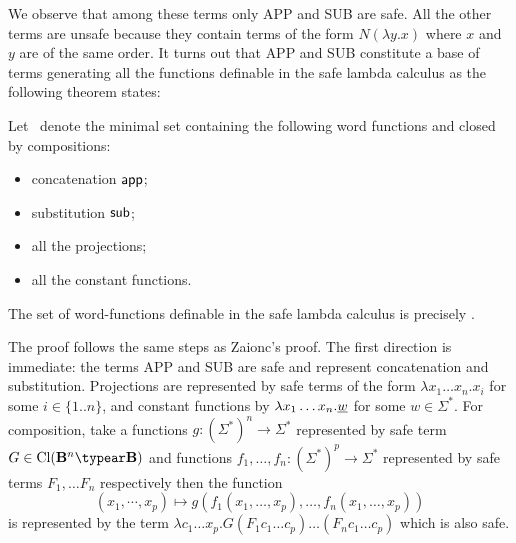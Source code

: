 We observe that among these terms only {\rm APP} and {\rm SUB} are
safe. All the other terms are unsafe because they contain terms of
the form $ N (\lambda y .x)$ where $x$ and $y$ are of the same
order. It turns out that {\rm APP} and {\rm SUB} constitute a base
of terms generating all the functions definable in the safe lambda
calculus as the following theorem states:
\begin{theorem}
\label{thm:wordfunctions_safely_definable}
Let \safedefset\ denote the minimal set containing the following word functions and closed by compositions:
\begin{itemize}
  \item concatenation ${\sf app}$;
  \item substitution ${\sf sub}$;
  \item all the projections;
  \item all the constant functions.
\end{itemize}
The set of word-functions definable in the safe lambda calculus is
precisely \safedefset.
\end{theorem}

The proof follows the same steps as Zaionc's proof. The first
direction is immediate: the terms {\rm APP} and {\rm SUB} are safe
and represent concatenation and substitution. Projections are
represented by safe terms of the form $\lambda x_1 \ldots x_n . x_i$
for some $i\in\{1..n\}$, and constant functions by $\lambda x_1
\ldots x_n . \underline{w}$ for some $w\in\Sigma^*$. For
composition, take a functions $g:(\Sigma^*)^n \rightarrow \Sigma^*$
represented by safe term $G\in \closedof{\zaiwordtyp^n \typear
\zaiwordtyp}$ and functions $f_1,\ldots,f_n : (\Sigma^*)^p
\rightarrow \Sigma^*$ represented by safe terms $F_1,\ldots F_n$
respectively then the function $$(x_1,\cdots,x_p) \mapsto
g(f_1(x_1,\ldots,x_p),\ldots,f_n(x_1,\ldots,x_p))$$ is represented
by the term $\lambda c_1\ldots x_p. G (F_1 c_1 \ldots c_p)\ldots
(F_n c_1 \ldots c_p)$ which is also safe.
\bigskip

